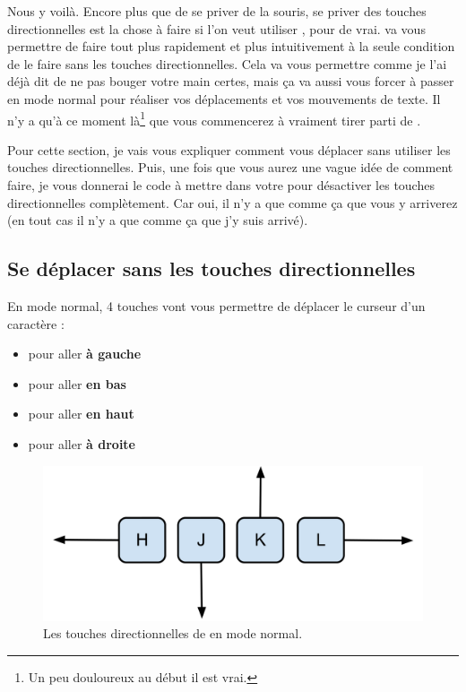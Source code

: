 Nous y voilà. Encore plus que de se priver de la souris, se priver des touches directionnelles est la chose à faire si l'on veut utiliser \vim, pour de vrai. \vim va vous permettre de faire tout plus rapidement et plus intuitivement à la seule condition de le faire sans les touches directionnelles.
Cela va vous permettre comme je l'ai déjà dit de ne pas bouger votre main certes, mais ça va aussi vous forcer à passer en mode \og normal \fg{} pour réaliser vos déplacements et vos mouvements de texte. Il n'y a qu'à ce moment là\footnote{Un peu douloureux au début il est vrai.} que vous commencerez à vraiment tirer parti de \vim.

Pour cette section, je vais vous expliquer comment vous déplacer sans utiliser les touches directionnelles. Puis, une fois que vous aurez une vague idée de comment faire, je vous donnerai le code à mettre dans votre \vimrc pour désactiver les touches directionnelles complètement. Car oui, il n'y a que comme ça que vous y arriverez (en tout cas il n'y a que comme ça que j'y suis arrivé).


\subsection{Se déplacer sans les touches directionnelles}

En mode normal, 4 touches vont vous permettre de déplacer le curseur d'un caractère :
\begin{itemize}
    \item \tth pour aller \textbf{à gauche}
    \item \ttj pour aller \textbf{en bas}
    \item \ttk pour aller \textbf{en haut}
    \item \ttl pour aller \textbf{à droite}
\end{itemize}

\begin{figure}%
  \includegraphics[width=\linewidth]{graphics/hjkl.png}
  \caption{Les \og touches directionnelles \fg{} de \vim en mode normal.}
  \label{fig:vim-hjkl}
\end{figure}


